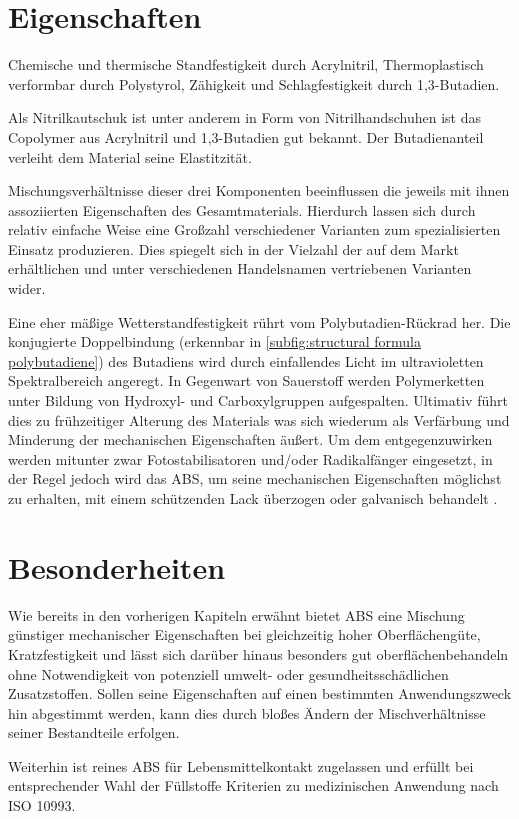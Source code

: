     \section{Eigenschaften}
            Chemische und thermische Standfestigkeit durch Acrylnitril, Thermoplastisch verformbar durch Polystyrol, Zähigkeit
            und Schlagfestigkeit durch 1,3-Butadien.
            
            Als Nitrilkautschuk ist unter anderem in Form von Nitrilhandschuhen ist das Copolymer aus Acrylnitril und
            1,3-Butadien gut bekannt. Der Butadienanteil verleiht dem Material seine Elastitzität.

            Mischungsverhältnisse dieser drei Komponenten beeinflussen die jeweils mit ihnen assoziierten Eigenschaften des
            Gesamtmaterials. Hierdurch lassen sich durch relativ einfache Weise eine Großzahl verschiedener Varianten zum
            spezialisierten Einsatz produzieren. Dies spiegelt sich in der Vielzahl der auf dem Markt erhältlichen und unter
            verschiedenen Handelsnamen vertriebenen Varianten wider.

            Eine eher mäßige Wetterstandfestigkeit rührt vom Polybutadien-Rückrad her. Die konjugierte Doppelbindung (erkennbar
            in \cref{subfig:structural formula polybutadiene}) des
            Butadiens wird durch einfallendes Licht im ultravioletten Spektralbereich angeregt. In Gegenwart von Sauerstoff
            werden Polymerketten unter Bildung von Hydroxyl- und Carboxylgruppen aufgespalten. Ultimativ führt dies zu
            frühzeitiger Alterung des Materials was sich wiederum als Verfärbung und Minderung der mechanischen Eigenschaften äußert.
            Um dem entgegenzuwirken werden mitunter zwar Fotostabilisatoren und/oder Radikalfänger eingesetzt, in der 
            Regel jedoch wird das ABS, um seine mechanischen Eigenschaften möglichst zu erhalten, mit einem schützenden Lack
            überzogen oder galvanisch behandelt \cite{Thermal.and.Photo-Degradation.of.Unstabilized.ABS.Adeniyi.1984,Domininghaus.1998.Kunststoffe.und.ihre.Eigenschaften}.

    \section{Besonderheiten}
            Wie bereits in den vorherigen Kapiteln erwähnt bietet ABS eine Mischung günstiger mechanischer Eigenschaften
            bei gleichzeitig hoher Oberflächengüte, Kratzfestigkeit und lässt sich darüber hinaus besonders gut oberflächenbehandeln
            ohne  Notwendigkeit von potenziell umwelt- oder gesundheitsschädlichen Zusatzstoffen. Sollen seine
            Eigenschaften auf einen bestimmten Anwendungszweck hin abgestimmt werden, kann dies durch bloßes Ändern der
            Mischverhältnisse seiner Bestandteile erfolgen.

            Weiterhin ist reines ABS für Lebensmittelkontakt zugelassen und erfüllt bei entsprechender Wahl der Füllstoffe
            Kriterien zu medizinischen Anwendung nach ISO 10993\cite{ABS.M30i.Datasheet.Stratasys.20210210}.